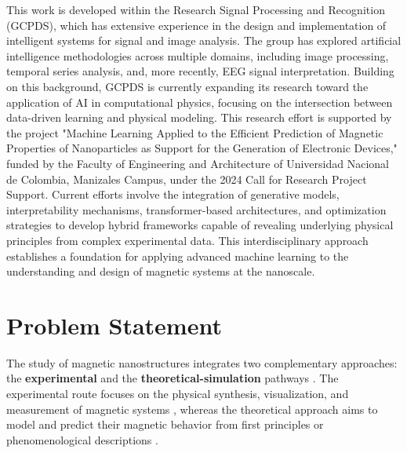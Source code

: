 \documentclass[letterpaper, 12, one column]{article}
\begin{document}
\vspace{0.5cm}
This work is developed within the Research Signal Processing and Recognition (GCPDS), which has extensive experience in the design and implementation of intelligent systems for signal and image analysis. The group has explored artificial intelligence methodologies across multiple domains, including image processing, temporal series analysis, and, more recently, EEG signal interpretation. Building on this background, GCPDS is currently expanding its research toward the application of AI in computational physics, focusing on the intersection between data-driven learning and physical modeling. This research effort is supported by the project "Machine Learning Applied to the Efficient Prediction of Magnetic Properties of Nanoparticles as Support for the Generation of Electronic Devices," funded by the Faculty of Engineering and Architecture of Universidad Nacional de Colombia, Manizales Campus, under the 2024 Call for Research Project Support. Current efforts involve the integration of generative models, interpretability mechanisms, transformer-based architectures, and optimization strategies to develop hybrid frameworks capable of revealing underlying physical principles from complex experimental data. This interdisciplinary approach establishes a foundation for applying advanced machine learning to the understanding and design of magnetic systems at the nanoscale.


\section{Problem Statement}\label{sec:problem_statement}
 
The study of magnetic nanostructures integrates two complementary approaches: the \textbf{experimental} and the \textbf{theoretical-simulation} pathways \cite{Andreu2020Anisotropic}. The experimental route focuses on the physical synthesis, visualization, and measurement of magnetic systems \cite{Nistico2020Magnetic}, whereas the theoretical approach aims to model and predict their magnetic behavior from first principles or phenomenological descriptions \cite{Li2023Magnetic}.
\end{document}
